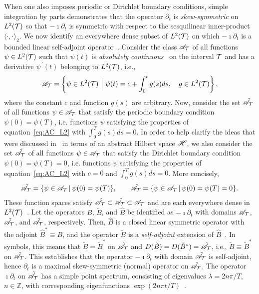 \documentclass[amsa]{ipart}
\begin{document}
When one also imposes periodic or Dirichlet boundary conditions,
simple integration by parts demonstrates that the operator $\partial_t$ is
\emph{skew-symmetric} on $L^2(\mathcal{T})$ so that $-\imath\partial_t$ is symmetric with
respect to the sesquilinear inner-product $\langle\cdot,\cdot\rangle_2$. We now identify an
everywhere dense subset of $L^2(\mathcal{T})$ on which $-\imath\partial_t$ is a bounded
linear self-adjoint operator~\cite{Reed-1980,Stone:64}. Consider the
class $\mathscr{A}_{\mathcal{T}}$ of all functions $\psi\in L^2(\mathcal{T})$ such that $\psi(t)$ is
\emph{absolutely continuous}~\cite{Royden:1988:RA} on the interval
$\mathcal{T}$ and has a derivative $\psi^{\,\prime}(t)$ belonging to $L^2(\mathcal{T})$,
i.e.,~\cite{Stone:64,Royden:1988:RA}     
%
\begin{align}\label{eq:AC_L2}
  \As_{\Tc}=
     \left\{
       \psi\in L^2(\Tc) \ \Big| \ \psi(t)=c+\int_0^tg(s)ds,
       \quad  g\in L^2(\Tc)
     \right\},
\end{align}
%
where the constant $c$ and function $g(s)$ are
arbitrary. Now, consider the set $\tilde{\mathscr{A}}_{\mathcal{T}}$ of all
functions $\psi\in\mathscr{A}_{\mathcal{T}}$ that satisfy the periodic boundary condition
$\psi(0)=\psi(T)$, i.e. functions $\psi$ satisfying the properties of 
equation~\eqref{eq:AC_L2} with $\int_0^Tg(s)ds=0$. In order to help
clarify the ideas that were discussed in~
in terms of an abstract 
Hilbert space $\mathscr{H}$, we also consider the set $\hat{\mathscr{A}}_{\mathcal{T}}$ of all
functions $\psi\in\mathscr{A}_{\mathcal{T}}$ that satisfy the Dirichlet boundary condition
$\psi(0)=\psi(T)=0$, i.e. functions $\psi$ satisfying the properties of
equation~\eqref{eq:AC_L2} with $c=0$ and $\int_0^Tg(s)ds=0$. More
concisely,  
%
\begin{align}\label{eq:AC_BC}
  \tilde{\As}_{\Tc}=\{\psi\in\As_{\Tc} \,|\, \psi(0)=\psi(T)\}, \qquad
  \hat{\As}_{\Tc}=\{\psi\in\As_{\Tc} \,|\, \psi(0)=\psi(T)=0\}.
\end{align}
%
These function spaces satisfy
$\hat{\mathscr{A}}_{\mathcal{T}}\subset\tilde{\mathscr{A}}_{\mathcal{T}}\subset\mathscr{A}_{\mathcal{T}}$ and are each everywhere
dense in $L^2(\mathcal{T})$~\cite{Stone:64}. Let the operators $B$,
$\tilde{B}$, and $\hat{B}$ be identified as $-\imath\partial_t$ with domains
$\mathscr{A}_{\mathcal{T}}$, $\tilde{\mathscr{A}}_{\mathcal{T}}$, and $\hat{\mathscr{A}}_{\mathcal{T}}$,
respectively. Then, $\hat{B}$ is a closed linear symmetric operator
with the adjoint $\hat{B}^*\equiv B$, and the operator $\tilde{B}$ is a
\emph{self-adjoint} extension of $\hat{B}$~\cite{Stone:64}. In
symbols, this means that $\tilde{B}=\tilde{B}^*$ on
$\tilde{\mathscr{A}}_{\mathcal{T}}$ and
$D(\tilde{B})=D(\tilde{B}^*)=\tilde{\mathscr{A}}_{\mathcal{T}}$,
i.e., $\tilde{B}\equiv\tilde{B}^*$ on $\tilde{\mathscr{A}}_{\mathcal{T}}$. This establishes
that the operator $-\imath\partial_t$ with domain $\tilde{\mathscr{A}}_{\mathcal{T}}$ is
self-adjoint, hence $\partial_t$ is a maximal skew-symmetric (normal)
operator on $\tilde{\mathscr{A}}_{\mathcal{T}}$. The operator $\imath\partial_t$ on
$\tilde{\mathscr{A}}_{\mathcal{T}}$ has a simple point spectrum, consisting of
eigenvalues $\lambda=2n\pi/T$, $n\in\mathbb{Z}$, with corresponding
eigenfunctions $\exp(2n\pi t/T)$~\cite{Stone:64}.
\end{document}
